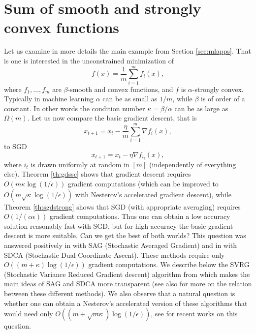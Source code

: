 \section{Sum of smooth and strongly convex functions}
Let us examine in more details the main example from Section \ref{sec:mlapps}. That is one is interested in the unconstrained minimization of 
$$f(x) = \frac1{m} \sum_{i=1}^m f_i(x) ,$$
where $f_1, \hdots, f_m$ are $\beta$-smooth and convex functions, and $f$ is $\alpha$-strongly convex. Typically in machine learning $\alpha$ can be as small as $1/m$, while $\beta$ is of order of a constant. In other words the condition number $\kappa= \beta / \alpha$ can be as large as $\Omega(m)$. Let us now compare the basic gradient descent, that is
$$x_{t+1} = x_t - \frac{\eta}{m} \sum_{i=1}^m \nabla f_i(x) ,$$
to SGD
$$x_{t+1} = x_t - \eta \nabla f_{i_t}(x) ,$$
where $i_t$ is drawn uniformly at random in $[m]$ (independently of everything else). Theorem \ref{th:gdssc} shows that gradient descent requires $O(m \kappa \log(1/\epsilon))$ gradient computations (which can be improved to $O(m \sqrt{\kappa} \log(1/\epsilon))$ with Nesterov's accelerated gradient descent), while Theorem \ref{th:sgdstrong} shows that SGD (with appropriate averaging) requires $O(1/ (\alpha \epsilon))$ gradient computations. Thus one can obtain a low accuracy solution reasonably fast with SGD, but for high accuracy the basic gradient descent is more suitable. Can we get the best of both worlds? This question was answered positively in \cite{LRSB12} with SAG (Stochastic Averaged Gradient) and in \cite{SSZ13} with SDCA (Stochastic Dual Coordinate Ascent). These methods require only $O((m+\kappa) \log(1/\epsilon))$ gradient computations. We describe below the SVRG (Stochastic Variance Reduced Gradient descent) algorithm from \cite{JZ13} which makes the main ideas of SAG and SDCA more transparent (see also \cite{DBLJ14} for more on the relation between these different methods). We also observe that a natural question is whether one can obtain a Nesterov's accelerated version of these algorithms that would need only $O((m + \sqrt{m \kappa}) \log(1/\epsilon))$, see \cite{SSZ13b, ZX14, AB14} for recent works on this question.

